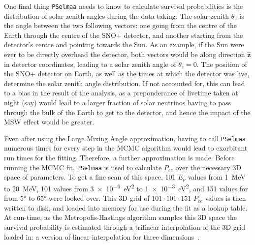 One final thing \texttt{PSelmaa} needs to know to calculate survival probabilities is the distribution of solar zenith angles during the data-taking. The solar zenith $\theta_{z}$ is the angle between the two following vectors: one going from the centre of the Earth through the centre of the SNO+ detector, and another starting from the detector's centre and pointing towards the Sun. As an example, if the Sun were ever to be directly overhead the detector, both vectors would be along direction $\bm{\hat{z}}$ in detector coordinates, leading to a solar zenith angle of $\theta_{z}=0$. The position of the SNO+ detector on Earth, as well as the times at which the detector was live, determine the solar zenith angle distribution. If not accounted for, this can lead to a bias in the result of the analysis, as a preponderance of livetime taken at night (say) would lead to a larger fraction of solar neutrinos having to pass through the bulk of the Earth to get to the detector, and hence the impact of the MSW effect would be greater.

Even after using the Large Mixing Angle approximation, having to call \texttt{PSelmaa} numerous times for every step in the MCMC algorithm would lead to exorbitant run times for the fitting. Therefore, a further approximation is made. Before running the MCMC fit, \texttt{PSelmaa} is used to calculate $P_{ee}$ over the necessary 3D space of parameters. To get a fine scan of this space, 101 $E_{\nu}$ values from \SI{1}{\MeV} to \SI{20}{\MeV}, 101 \dmsq{} values from \SI{3e-6}{\eV\squared} to \SI{1e-3}{\eV\squared}, and 151 values for \tonetwo{} from \ang{5} to \ang{65} were looked over. This 3D grid of $101\cdot101\cdot151$ $P_{ee}$ values is then written to disk, and loaded into memory for use during the fit as a lookup table. At run-time, as the Metropolis-Hastings algorithm samples this 3D space the survival probability is estimated through a trilinear interpolation of the 3D grid loaded in: a version of linear interpolation for three dimensions~\cite{}. %

